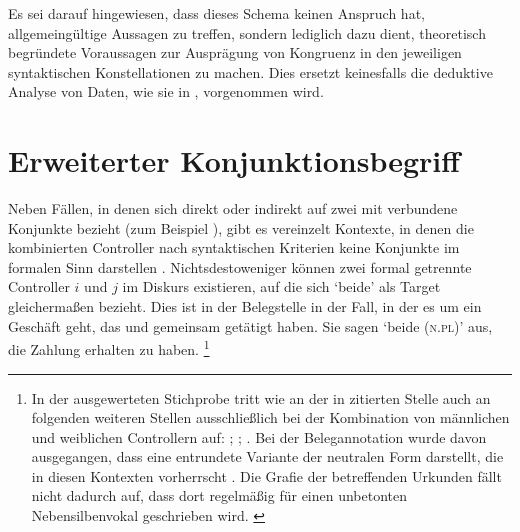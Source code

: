 Es sei darauf hingewiesen, dass dieses Schema keinen Anspruch hat,
allgemeingültige Aussagen zu treffen, sondern lediglich dazu dient, theoretisch
begründete Voraussagen zur Ausprägung von Kongruenz in den jeweiligen
syntaktischen Konstellationen zu machen. Dies ersetzt keinesfalls die deduktive
Analyse von Daten, wie sie in ,  vorgenommen
wird.

\section{Erweiterter Konjunktionsbegriff}
\label{sec:erwkonjbegr}

Neben Fällen, in denen sich  direkt oder indirekt auf zwei mit
 verbundene Konjunkte bezieht (zum Beispiel ), gibt es vereinzelt Kontexte, in denen die
kombinierten Controller nach syntaktischen Kriterien keine Konjunkte im
formalen Sinn darstellen \autocite[vgl.~auch][247--248]{askedal1973}.
Nichtsdestoweniger können zwei formal getrennte Controller $i$ und $j$ im
Diskurs existieren, auf die sich  `beide' als Target
gleichermaßen bezieht. Dies ist in der Belegstelle in 
der Fall, in der es um ein Geschäft geht, das  und 
gemeinsam getätigt haben. Sie sagen  `beide (\textsc{n.pl})' aus, die
Zahlung erhalten zu haben.%
%
	\footnote{In der ausgewerteten Stichprobe tritt  wie an der in
		 zitierten Stelle auch an folgenden weiteren
		Stellen ausschließlich bei der Kombination von männlichen und
		weiblichen Controllern auf:
		\citet[124,23; Nr.~81, Kl.~Tennenbach, Kr.~Emmendingen, 1264]{cao1};
		\citet[205,38--39; Nr.~190, Basel, 1273]{cao1};
		\citet[175,14; Nr.~N~230, Straßburg, 1283]{cao5}.
		Bei der Belegannotation wurde davon ausgegangen, dass 
		eine entrundete Variante der neutralen Form  darstellt,
		die in diesen Kontexten vorherrscht \autocites(siehe auch
		)[vgl.][41]{paul2007}. Die Grafie der
		betreffenden Urkunden fällt nicht dadurch auf, dass dort regelmäßig
		 für einen unbetonten Nebensilbenvokal geschrieben wird.
		\label{fn:caoalemschwa}}

